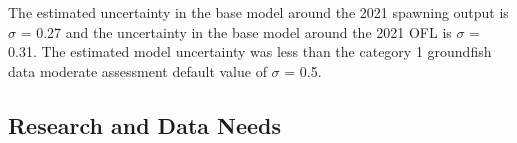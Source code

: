 \documentclass[11pt,
  english,
  a4paper,
]{article}
\begin{document}
\leavevmode\tagmcend\tagstructend


The estimated uncertainty in the base model around the 2021 spawning output is {\(\sigma\)\leavevmode\tagmcend\tagstructend} = 0.27 and the uncertainty in the base model around the 2021 OFL is {\(\sigma\)\leavevmode\tagmcend\tagstructend} = 0.31. The estimated model uncertainty was less than the category 1 groundfish data moderate assessment default value of {\(\sigma\)\leavevmode\tagmcend\tagstructend} = 0.5.

\leavevmode\tagmcend\tagstructend\par


\hypertarget{research-and-data-needs-1}{%
\subsection{Research and Data Needs}\label{research-and-data-needs-1}}

\leavevmode\tagmcend\tagstructend

\end{document}
